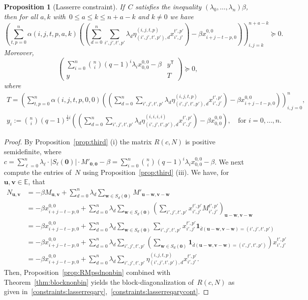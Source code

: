 \documentclass[10pt,a4paper]{article}
\newcommand{\E}{\mathbb{E}}
\newcommand{\one}{\mathbf{1}}
\newtheorem{proposition}[theorem]{Proposition}
\theoremstyle{definition}
\newcommand{\uu}{\mathbf{u}}
\newcommand{\vv}{\mathbf{v}}
\newcommand{\ww}{\mathbf{w}}
\newcommand{\zero}{\mathbf{0}}
\newcommand{\T}{^{\mathsf{T}}}
\begin{document}
\begin{proposition}[Lasserre constraint]\label{prop:thirdlasserreqary}
If~$C$ satisfies the inequality $(\lambda_0,\ldots,\lambda_n)\beta$, then for all $a,k$ with~$0 \leq a \leq k \leq n+a-k$ and $k \neq 0$ we have 
\begin{equation}\label{constraints:lasserreqary}
\left(\sum_{t,p=0}^n \alpha(i,j,t,p,a,k) \left(\left(\sum_{d=0}^n\sum_{i',j',t',p'}\lambda_d \eta_{(i',j',t',p'),d}^{(i,j,t,p)} x_{i',j' }^{t',p'}\right) - \beta x^{0,0}_{i+j-t-p,0} \right)\right)_{i,j=k}^{n+a-k} \succeq 0.
\end{equation}
Moreover, 
\begin{equation}\label{constraints:lasserreqarycont}
\begin{pmatrix} \sum_{i=0}^n \binom{n}{i}(q-1)^i \lambda_i x_{0,0}^{0,0} -\beta & y\T \\ y &  T   \end{pmatrix} \succeq 0,
\end{equation}
where 
\begin{align*}
    T=\left(\sum_{t,p=0}^n \alpha(i,j,t,p,0,0) \left(\left(\sum_{d=0}^n\sum_{i',j',t',p'}\lambda_d \eta_{(i',j',t',p'),d}^{(i,j,t,p)} x_{i',j' }^{t',p'}\right) - \beta x^{0,0}_{i+j-t-p,0} \right)\right)_{i,j=0}^{n}, \\
    y_i:=\binom{n}{i}(q-1)^{\frac{1}{2}i}\left(\left(\sum_{d=0}^n\sum_{i',j',t',p'}\lambda_d \eta_{(i',j',t',p'),d}^{(i,i,i,i)} x_{i',j' }^{t',p'}\right) - \beta x^{0,0}_{0,0} \right), \quad \text{for $i=0,\ldots,n$.}
\end{align*} 
\end{proposition}
\begin{proof} 
By Proposition~\ref{prop:third} (i) the matrix $R(c,N)$ is positive semidefinite, where $c=\sum_{\ell=0}^n \lambda_{\ell}\cdot|S_{\ell}(\zero)|\cdot M'_{\zero,\zero} -\beta = \sum_{i=0}^n \binom{n}{i}(q-1)^i \lambda_i x_{0,0}^{0,0} -\beta$. We next compute the entries of~$N$ using Proposition~\ref{prop:third} (iii). We have, for~$\uu,\vv \in \E$, that
\begin{align*}
N_{\uu,\vv}&= -\beta M_{\uu,\vv} + \sum_{d =0}^n \lambda_{d} \sum_{\ww \in S_d(\zero)} M'_{\uu-\ww, \vv-\ww}
\\&= -\beta x_{i+j-t-p,0}^{0,0} +  \sum_{d=0}^n \lambda_d\sum_{\ww \in S_d(\bm 0)} \left(\sum_{i',j',t',p'} x_{i',j'}^{t',p'} M_{i',j'}^{t',p'}  \right)_{\uu-\ww,\vv-\ww} 
 \\&= -\beta x_{i+j-t-p,0}^{0,0}+ \sum_{d=0}^n \lambda_{d} \sum_{\ww \in S_d(\bm 0)} \sum_{i',j',t',p'} x_{i',j'}^{t',p'}\one_{\overline{d}(\uu-\ww,\vv-\ww)=(i',j',t',p')} 
 \\&= -\beta x_{i+j-t-p,0}^{0,0}+ \sum_{d=0}^n \lambda_{d} \sum_{i',j',t',p'} \left( \sum_{\ww \in S_d(\bm 0 )}  \one_{\overline{d}(\uu-\ww,\vv-\ww)=(i',j',t',p')} \right) x_{i',j'}^{t',p'}
 \\&= -\beta x_{i+j-t-p,0}^{0,0} + \sum_{d=0}^n\lambda_d \sum_{i',j',t',p'}\eta_{(i',j',t',p'),d}^{(i,j,t,p)} x_{i',j' }^{t',p'}. 
\end{align*}
Then, Proposition~\ref{prop:RMpsdnonbin} combined with Theorem~\ref{thm:blocknonbin} yields the block-diagonalization of~$R(c,N)$ as given in~\eqref{constraints:lasserreqary},~\eqref{constraints:lasserreqarycont}.
\end{proof} 
\end{document}
